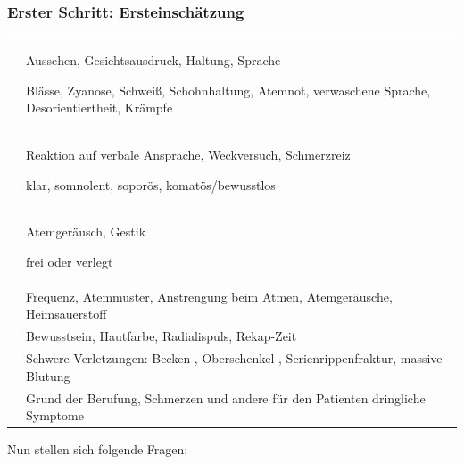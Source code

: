 
\subsubsection{Erster Schritt: Ersteinsch\"atzung}
\begin{center}
\begin{tabulary}{\linewidth}[H]{CL}
\toprule
 &
Aussehen, Gesichtsausdruck, Haltung, Sprache

Bl\"asse, Zyanose, Schweiß, Schohnhaltung, Atemnot, verwaschene
Sprache, Des\-orientiertheit, Kr\"ampfe 
\\\addlinespace
 &
Reaktion auf verbale Ansprache, Weckversuch, Schmerzreiz

klar, somnolent, soporös, komatös/bewusstlos
\\\addlinespace
 &
Atemger\"ausch, Gestik

frei oder verlegt
\\\addlinespace
 &
Frequenz, Atemmuster, Anstrengung beim Atmen, Atemger\"ausche,
Heimsauerstoff
\\\addlinespace
 &
Bewusstsein, Hautfarbe, Radialispuls, Rekap-Zeit
\\\addlinespace
 &
Schwere Verletzungen: Becken-, Oberschenkel-, Serienrippenfraktur,
massive Blutung
\\\addlinespace
 &
Grund der Berufung, Schmerzen und andere für den Patienten dringliche
Symptome
\\\bottomrule
\end{tabulary}
\end{center}
% 
% 
% 
% 
% 
% 
% 
% 
% 
% 
% 
% 
Nun stellen sich folgende Fragen:


